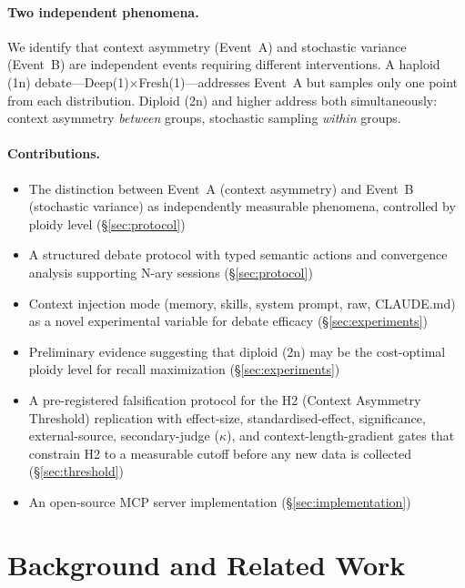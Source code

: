 \documentclass[11pt]{article}
\begin{document}
\paragraph{Two independent phenomena.} We identify that context asymmetry (Event~A) and stochastic variance (Event~B) are independent events requiring different interventions. A haploid (1n) debate---Deep(1)$\times$Fresh(1)---addresses Event~A but samples only one point from each distribution. Diploid (2n) and higher address both simultaneously: context asymmetry \emph{between} groups, stochastic sampling \emph{within} groups.

\paragraph{Contributions.}
\begin{itemize}[leftmargin=1.5em]
  \item The distinction between Event~A (context asymmetry) and Event~B (stochastic variance) as independently measurable phenomena, controlled by ploidy level (\S\ref{sec:protocol})
  \item A structured debate protocol with typed semantic actions and convergence analysis supporting N-ary sessions (\S\ref{sec:protocol})
  \item Context injection mode (memory, skills, system prompt, raw, CLAUDE.md) as a novel experimental variable for debate efficacy (\S\ref{sec:experiments})
  \item Preliminary evidence suggesting that diploid (2n) may be the cost-optimal ploidy level for recall maximization (\S\ref{sec:experiments})
  \item A pre-registered falsification protocol for the H2 (Context Asymmetry Threshold) replication with effect-size, standardised-effect, significance, external-source, secondary-judge ($\kappa$), and context-length-gradient gates that constrain H2 to a measurable cutoff before any new data is collected (\S\ref{sec:threshold})
  \item An open-source MCP server implementation (\S\ref{sec:implementation})
\end{itemize}

\section{Background and Related Work}
\label{sec:related}
\end{document}
